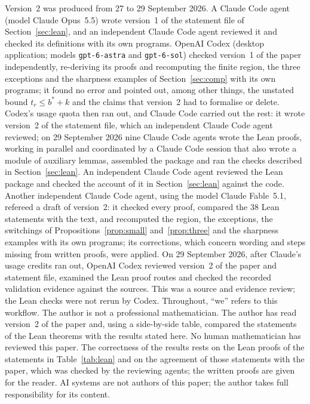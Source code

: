 \documentclass[11pt]{article}
\numberwithin{equation}{section}
\theoremstyle{remark}
\begin{document}
Version~2 was produced from 27 to 29 September 2026. A Claude Code agent
(model Claude Opus~5.5) wrote version~1 of the statement file of
Section~\ref{sec:lean}, and an independent Claude Code agent reviewed it and
checked its definitions with its own programs. OpenAI Codex (desktop
application; models \texttt{gpt-6-astra} and \texttt{gpt-6-sol}) checked
version~1 of the paper independently, re-deriving its proofs and recomputing
the finite region, the three exceptions and the sharpness examples of
Section~\ref{sec:comp} with its own programs; it found no error and pointed
out, among other things, the unstated bound $t_r\le b^*+k$ and the claims that
version~2 had to formalise or delete. Codex's usage quota then ran out, and
Claude Code carried out the rest: it wrote version~2 of the statement file,
which an independent Claude Code agent reviewed; on 29 September 2026 nine
Claude Code agents wrote the Lean proofs, working in parallel and coordinated by
a Claude Code session that also wrote a module of auxiliary lemmas, assembled
the package and ran the checks described in Section~\ref{sec:lean}. An
independent Claude Code agent reviewed the Lean package and checked the account
of it in Section~\ref{sec:lean} against the code.
Another independent Claude Code agent, using the model Claude Fable~5.1,
refereed a draft of version~2: it checked every proof, compared the $38$ Lean
statements with the text, and recomputed the region, the exceptions, the
switchings of Propositions~\ref{prop:small} and~\ref{prop:three} and the
sharpness examples with its own programs; its corrections, which concern
wording and steps missing from written proofs, were applied.
On 29 September 2026, after Claude's usage credits ran out, OpenAI Codex
reviewed version~2 of the paper and statement file, examined the Lean proof
routes and checked the recorded validation evidence against the sources.
This was a source and evidence review; the Lean checks were not rerun by
Codex. Throughout, ``we'' refers to this workflow. The author is
not a professional mathematician.
The author has read version~2 of the paper and, using a side-by-side table,
compared the statements of the Lean theorems with the results stated here.
No human mathematician has reviewed this paper. The correctness of the results
rests on the Lean proofs of the statements in Table~\ref{tab:lean} and on the
agreement of those statements with the paper, which was checked by the
reviewing agents; the written proofs are given for the reader. AI systems are
not authors of this paper; the author takes full responsibility for its
content.
\end{document}
